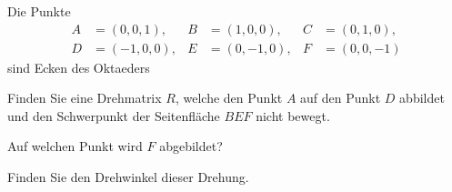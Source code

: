 Die Punkte
\begin{align*}
A&=(0,0,1),
&
B&=(1,0,0),
&
C&=(0,1,0),
\\
D&=(-1,0,0),
&
E&=(0,-1,0),
&
F&=(0,0,-1)
\end{align*}
sind Ecken des Oktaeders
\begin{center}
\end{center}

\begin{teilaufgaben}
\item Finden Sie eine Drehmatrix $R$, welche den Punkt $A$ auf den Punkt $D$
abbildet und den Schwerpunkt der Seitenfläche $BEF$ nicht bewegt.
\item Auf welchen Punkt wird $F$ abgebildet?
\item Finden Sie den Drehwinkel dieser Drehung.
\end{teilaufgaben}


